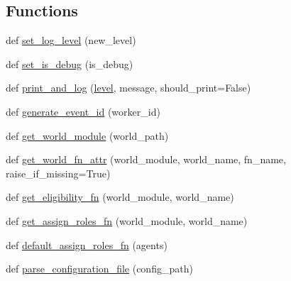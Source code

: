 \subsection*{Functions}
\begin{DoxyCompactItemize}
\item 
def \hyperlink{namespaceparlai_1_1messenger_1_1core_1_1shared__utils_af3d517192e83322d8985e72fb2227889}{set\+\_\+log\+\_\+level} (new\+\_\+level)
\item 
def \hyperlink{namespaceparlai_1_1messenger_1_1core_1_1shared__utils_a1de3e223130be75acbdf886a0554de03}{set\+\_\+is\+\_\+debug} (is\+\_\+debug)
\item 
def \hyperlink{namespaceparlai_1_1messenger_1_1core_1_1shared__utils_a9e67fcc4b560457a8945eaa7f1c11b5c}{print\+\_\+and\+\_\+log} (\hyperlink{namespaceparlai_1_1messenger_1_1core_1_1shared__utils_a99fb4611391707176393ddf07d4af7d5}{level}, message, should\+\_\+print=False)
\item 
def \hyperlink{namespaceparlai_1_1messenger_1_1core_1_1shared__utils_ab77a97712359a0fe394c7c09c58387f9}{generate\+\_\+event\+\_\+id} (worker\+\_\+id)
\item 
def \hyperlink{namespaceparlai_1_1messenger_1_1core_1_1shared__utils_a248b150a0f94e645ab5c9cbeca09f92e}{get\+\_\+world\+\_\+module} (world\+\_\+path)
\item 
def \hyperlink{namespaceparlai_1_1messenger_1_1core_1_1shared__utils_a0a712961ea39c275ec4003871d0ff950}{get\+\_\+world\+\_\+fn\+\_\+attr} (world\+\_\+module, world\+\_\+name, fn\+\_\+name, raise\+\_\+if\+\_\+missing=True)
\item 
def \hyperlink{namespaceparlai_1_1messenger_1_1core_1_1shared__utils_a4eab6934f22c919b9a02da591739c192}{get\+\_\+eligibility\+\_\+fn} (world\+\_\+module, world\+\_\+name)
\item 
def \hyperlink{namespaceparlai_1_1messenger_1_1core_1_1shared__utils_ae5c062bdee92b3a18f187904e0ec8120}{get\+\_\+assign\+\_\+roles\+\_\+fn} (world\+\_\+module, world\+\_\+name)
\item 
def \hyperlink{namespaceparlai_1_1messenger_1_1core_1_1shared__utils_a24cf73f90b26b987041361a5898f4eab}{default\+\_\+assign\+\_\+roles\+\_\+fn} (agents)
\item 
def \hyperlink{namespaceparlai_1_1messenger_1_1core_1_1shared__utils_ae8a8704d759812f55b4228b5b913b99a}{parse\+\_\+configuration\+\_\+file} (config\+\_\+path)
\end{DoxyCompactItemize}
